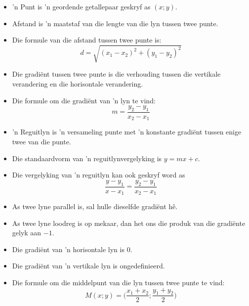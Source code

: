 \summary{}
\begin{itemize}[noitemsep]
\item 'n Punt is 'n geordende getallepaar geskryf as $(x;y)$.
\item Afstand is 'n maatstaf van die lengte van die lyn tussen twee punte.
\item Die formule van die afstand tussen twee punte is: 
\begin{equation*}
d=\sqrt{{({x}_{1}-{x}_{2})}^{2}+{({y}_{1}-{y}_{2})}^{2}}
\end{equation*}
\item Die gradi\"ent tussen twee punte is die verhouding tussen die vertikale verandering en die horisontale verandering.

\item Die formule om die gradiënt van ’n lyn te vind: 
\begin{equation*}
m=\frac{{y}_{2}-{y}_{1}}{{x}_{2}-{x}_{1}}
\end{equation*}
\item 'n Reguitlyn is 'n versameling punte met 'n konstante gradi\"ent tussen enige twee van die punte.
\item Die standaardvorm van 'n reguitlynvergelyking is $y=mx+c$.
\item Die vergelyking van 'n reguitlyn kan ook geskryf word as
\begin{equation*}
\dfrac{y-y_1}{x-x_1}=\dfrac{y_2-y_1}{x_2-x_1}\end{equation*}
\item As twee lyne parallel is, sal hulle dieselfde gradiënt hê.
\item As twee lyne loodreg is op mekaar,
dan het ons die produk van die gradi\"ente gelyk aan $-1$.
\item Die gradi\"ent van 'n horisontale lyn is $0$.
\item Die gradi\"ent van 'n vertikale lyn is ongedefinieerd.
\item Die formule om die middelpunt van die lyn tussen twee punte te vind: 
\begin{equation*}
M(x;y) = \Big(\frac{{x}_{1}+{x}_{2}}{2};\frac{{y}_{1}+{y}_{2}}{2}\Big)
\end{equation*}
\end{itemize}


